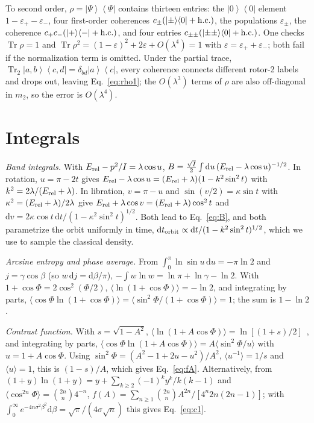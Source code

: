 \documentclass[pra,twocolumn,superscriptaddress,longbibliography,floatfix]{revtex4-2}
\newcommand{\Tr}{\operatorname{Tr}}
\newcommand{\ketbra}[2]{\left|#1\right\rangle\!\left\langle#2\right|}
\newcommand{\dd}{\mathrm{d}}
\newcommand{\Erel}{E_{\rm rel}}
\newcommand{\epsp}{\varepsilon_{+}}
\newcommand{\epsm}{\varepsilon_{-}}
\begin{document}
To second order, $\rho=\ketbra\Psi\Psi$ contains thirteen entries: the
$\ketbra00$ element $1-\epsp-\epsm$, four first-order coherences
$c_{\pm}(\ketbra\pm0+{\rm h.c.})$, the populations $\varepsilon_{\pm}$, the
coherence $c_{+}c_{-}(\ketbra+-+{\rm h.c.})$, and four entries
$c_{\pm\pm}(\ketbra{\pm\pm}0+{\rm h.c.})$. One checks
$\Tr\rho=1$ and $\Tr\rho^{2}=(1-\varepsilon)^{2}+2\varepsilon+O(\lambda^{4})=1$
with $\varepsilon=\epsp+\epsm$; both fail if the normalization term is omitted.
Under the partial trace, $\Tr_{2}\ketbra{a,b}{c,d}=\delta_{bd}\ketbra ac$, every
coherence connects different rotor-2 labels and drops out, leaving
Eq.~\eqref{eq:rho1}; the $O(\lambda^{3})$ terms of $\rho$ are also off-diagonal
in $m_{2}$, so the error is $O(\lambda^{4})$.

\section{Integrals}
\label{app:integrals}

\emph{Band integrals.} With $\Erel-p^{2}/I=\lambda\cos u$,
$B=\tfrac{\sqrt I}{2}\int\dd u\,(\Erel-\lambda\cos u)^{-1/2}$. In rotation,
$u=\pi-2t$ gives $\Erel-\lambda\cos u=(\Erel+\lambda)(1-k^{2}\sin^{2}t)$ with
$k^{2}=2\lambda/(\Erel+\lambda)$. In libration, $v=\pi-u$ and
$\sin(v/2)=\kappa\sin t$ with $\kappa^{2}=(\Erel+\lambda)/2\lambda$ give
$\Erel+\lambda\cos v=(\Erel+\lambda)\cos^{2}t$ and
$\dd v=2\kappa\cos t\,\dd t/(1-\kappa^{2}\sin^{2}t)^{1/2}$. Both lead to
Eq.~\eqref{eq:B}, and both parametrize the orbit uniformly in time,
$\dd t_{\rm orbit}\propto\dd t/(1-k^{2}\sin^{2}t)^{1/2}$, which we use to sample
the classical density.

\emph{Arcsine entropy and phase average.} From
$\int_{0}^{\pi}\ln\sin u\,\dd u=-\pi\ln2$ and $j=\gamma\cos\beta$ (so
$w\,\dd j=\dd\beta/\pi$), $-\int w\ln w=\ln\pi+\ln\gamma-\ln2$. With
$1+\cos\Phi=2\cos^{2}(\Phi/2)$, $\langle\ln(1+\cos\Phi)\rangle=-\ln2$, and
integrating by parts, $\langle\cos\Phi\ln(1+\cos\Phi)\rangle=
\langle\sin^{2}\Phi/(1+\cos\Phi)\rangle=1$; the sum is $1-\ln2$.

\emph{Contrast function.} With $s=\sqrt{1-A^{2}}$,
$\langle\ln(1+A\cos\Phi)\rangle=\ln[(1+s)/2]$~\cite{GR}, and integrating by
parts, $\langle\cos\Phi\ln(1+A\cos\Phi)\rangle=A\langle\sin^{2}\Phi/u\rangle$
with $u=1+A\cos\Phi$. Using $\sin^{2}\Phi=(A^{2}-1+2u-u^{2})/A^{2}$,
$\langle u^{-1}\rangle=1/s$ and $\langle u\rangle=1$, this is $(1-s)/A$, which
gives Eq.~\eqref{eq:fA}. Alternatively, from
$(1+y)\ln(1+y)=y+\sum_{k\ge2}(-1)^{k}y^{k}/k(k-1)$ and
$\langle\cos^{2n}\Phi\rangle=\binom{2n}{n}4^{-n}$,
$f(A)=\sum_{n\ge1}\binom{2n}{n}A^{2n}/[4^{n}2n(2n-1)]$; with
$\int_{0}^{\infty}e^{-4n\sigma^{2}\beta^{2}}\dd\beta=\sqrt\pi/(4\sigma\sqrt n)$ this
gives Eq.~\eqref{eq:c1}.
\end{document}
